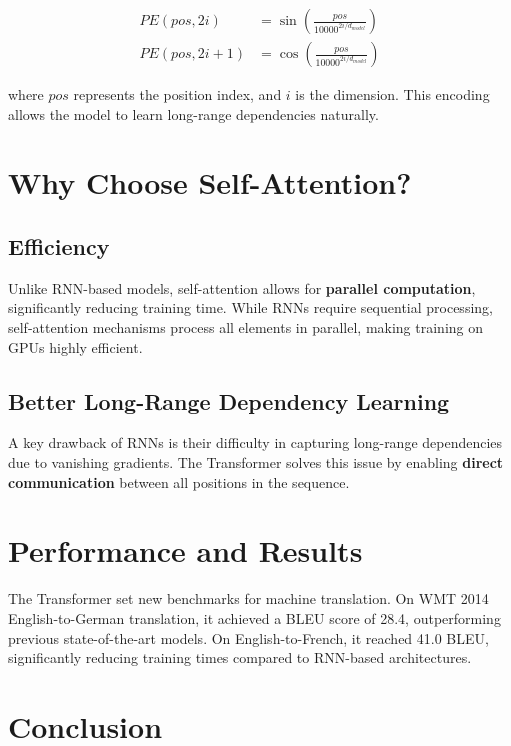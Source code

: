 \documentclass{article}
\begin{document}
\begin{align}
    PE(pos, 2i) &= \sin \left(\frac{pos}{10000^{2i/d_{model}}} \right) \\
    PE(pos, 2i+1) &= \cos \left(\frac{pos}{10000^{2i/d_{model}}} \right)
\end{align}

where $pos$ represents the position index, and $i$ is the dimension. This encoding allows the model to learn long-range dependencies naturally.

\section{Why Choose Self-Attention?}

\subsection{Efficiency}

Unlike RNN-based models, self-attention allows for \textbf{parallel computation}, significantly reducing training time. While RNNs require sequential processing, self-attention mechanisms process all elements in parallel, making training on GPUs highly efficient.

\subsection{Better Long-Range Dependency Learning}

A key drawback of RNNs is their difficulty in capturing long-range dependencies due to vanishing gradients. The Transformer solves this issue by enabling \textbf{direct communication} between all positions in the sequence.

\section{Performance and Results}

The Transformer set new benchmarks for machine translation. On WMT 2014 English-to-German translation, it achieved a BLEU score of 28.4, outperforming previous state-of-the-art models. On English-to-French, it reached 41.0 BLEU, significantly reducing training times compared to RNN-based architectures.

\section{Conclusion}
\end{document}
